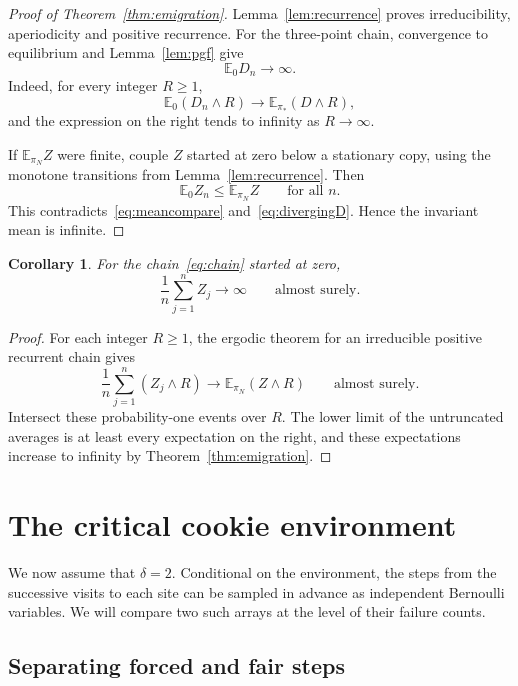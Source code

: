 \documentclass[11pt]{amsart}
\numberwithin{equation}{section}
\newtheorem{corollary}[theorem]{Corollary}
\theoremstyle{remark}
\newcommand{\E}{\mathbb E}
\begin{document}
\begin{proof}[Proof of Theorem~\ref{thm:emigration}]
Lemma~\ref{lem:recurrence} proves irreducibility, aperiodicity and positive recurrence. For the three-point chain, convergence to equilibrium and Lemma~\ref{lem:pgf} give
\begin{equation}\label{eq:divergingD}
 \E_0D_n\longrightarrow\infty.
\end{equation}
Indeed, for every integer $R\ge1$,
\[
 \E_0(D_n\wedge R)\longrightarrow\E_{\pi_*}(D\wedge R),
\]
and the expression on the right tends to infinity as $R\to\infty$.

If $\E_{\pi_N}Z$ were finite, couple $Z$ started at zero below a stationary copy, using the monotone transitions from Lemma~\ref{lem:recurrence}. Then
\[
 \E_0Z_n\le\E_{\pi_N}Z\qquad\text{for all }n.
\]
This contradicts~\eqref{eq:meancompare} and~\eqref{eq:divergingD}. Hence the invariant mean is infinite.
\end{proof}

\begin{corollary}\label{cor:timeaverage}
For the chain~\eqref{eq:chain} started at zero,
\[
 \frac1n\sum_{j=1}^nZ_j\longrightarrow\infty\qquad\text{almost surely}.
\]
\end{corollary}

\begin{proof}
For each integer $R\ge1$, the ergodic theorem for an irreducible positive recurrent chain gives
\[
 \frac1n\sum_{j=1}^n(Z_j\wedge R)
 \longrightarrow\E_{\pi_N}(Z\wedge R)\qquad\text{almost surely}.
\]
Intersect these probability-one events over $R$. The lower limit of the untruncated averages is at least every expectation on the right, and these expectations increase to infinity by Theorem~\ref{thm:emigration}.
\end{proof}

\section{The critical cookie environment}\label{sec:walk}

We now assume that $\delta=2$. Conditional on the environment, the steps from the successive visits to each site can be sampled in advance as independent Bernoulli variables. We will compare two such arrays at the level of their failure counts.

\subsection{Separating forced and fair steps}
\end{document}
